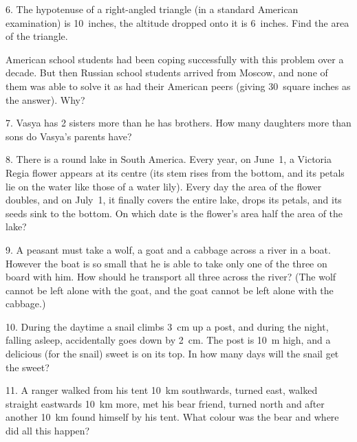 \begin{problem}{6.}
	The hypotenuse of a right-angled triangle (in a standard American examination) is 10~inches,
	the altitude dropped onto it is 6~inches. Find the area of the triangle.

	American school students had been coping successfully with this problem over a decade.
	But then Russian school students arrived from Moscow, and none of them was able to solve it as had their American peers
	(giving 30~square inches as the answer). Why?
\end{problem}

\begin{problem}{7.}
	Vasya has 2 sisters more than he has brothers. How many daughters more than sons do Vasya's parents have?
\end{problem}

\begin{problem}{8.}
	There is a round lake in South America. Every year, on June~1, a Victoria Regia flower appears at its
	centre (its stem rises from the bottom, and its petals lie on the water like those of a water lily). Every day
	the area of the flower doubles, and on July~1, it finally covers the entire lake, drops its petals, and its seeds
	sink to the bottom. On which date is the flower's area half the area of the lake?
\end{problem}

\begin{problem}{9.}
	A peasant must take a wolf, a goat and a cabbage across a river in a boat. However the boat is so small that
	he is able to take only one of the three on board with him. How should he transport all three across
	the river? (The wolf cannot be left alone with the goat, and the goat cannot be left alone with the cabbage.)
\end{problem}

\begin{problem}{10.}
	During the daytime a snail climbs \SI{3}{\cm} up a post, and during the night, falling asleep, accidentally
	goes down by \SI{2}{\cm}. The post is \SI{10}{\metre} high, and a delicious (for the snail) sweet is on its top.
	In how many days will the snail get the sweet?
\end{problem}

\begin{problem}{11.}
	A ranger walked from his tent \SI{10}{\km} southwards, turned east, walked straight eastwards \SI{10}{\km} more,
	met his bear friend, turned north and after another \SI{10}{\km} found himself by his tent. What colour was the bear
	and where did all this happen?
\end{problem}

